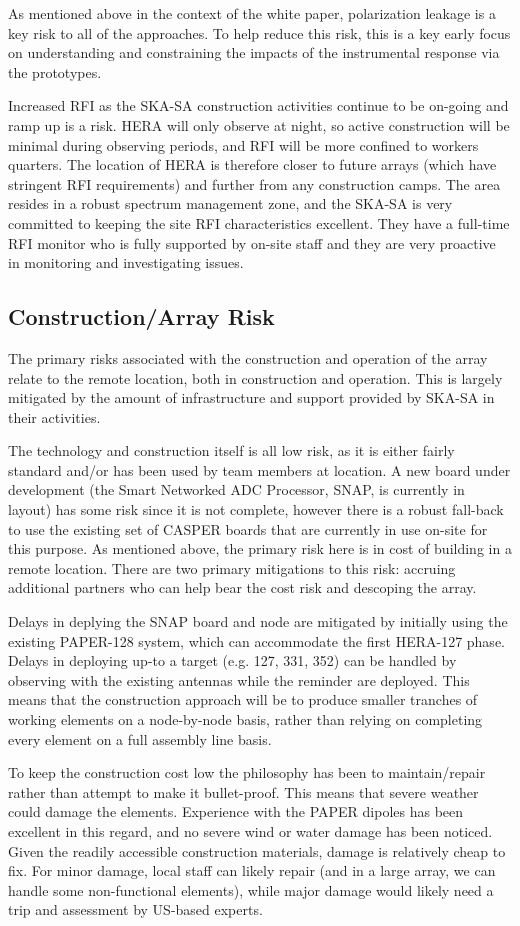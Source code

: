 \documentclass[preprint]{aastex}
\begin{document}
As mentioned above in the context of the white paper, polarization leakage is a key
risk to all of the approaches.  To help reduce this risk, this is a key early focus on understanding and
constraining the impacts of the instrumental response via the prototypes.

Increased RFI as the SKA-SA construction activities continue to be on-going and 
ramp up is a risk.  HERA will only observe at night, so active construction will be
minimal during observing periods, and RFI will be more confined to workers quarters.
The location of HERA is therefore closer to future arrays (which have stringent
RFI requirements) and further from any construction camps.  The area resides in
a robust spectrum management zone, and the SKA-SA is very committed to
keeping the site RFI characteristics excellent.  They have a full-time RFI monitor
who is fully supported by on-site staff and they are very proactive in monitoring
and investigating issues.

\subsection{Construction/Array Risk}
The primary risks associated with the construction and operation of the array relate
to the remote location, both in construction and operation. This is largely mitigated
by the amount of infrastructure and support provided by SKA-SA in their activities.

The technology and construction itself is all low risk, as it is either fairly standard and/or
has been used by team members at location.  A new board under development (the Smart Networked
ADC Processor, SNAP, is currently in layout) has some risk since it is not complete, however there
is a robust fall-back to use the existing set of CASPER boards that are currently in use on-site for this
purpose.  As mentioned above, the primary risk here is in cost of building in a remote location.
There are two primary mitigations to this risk:  accruing additional partners who can help bear
the cost risk and descoping the array.

Delays in deplying the SNAP board and node are
mitigated by initially using the existing PAPER-128 system, which can accommodate the first 
HERA-127 phase.  Delays in deploying up-to a target (e.g. 127, 331, 352) can be handled by
observing with the existing antennas while the reminder are deployed.  This means that the
construction approach will be to produce smaller tranches of working elements on a node-by-node
basis, rather than relying on completing every element on a full assembly line basis.

To keep the construction cost low the philosophy has been to maintain/repair rather
than attempt to make it bullet-proof. This means that severe weather could damage the
elements. Experience with the PAPER dipoles has been excellent in this regard, and no
severe wind or water damage has been noticed. Given the readily accessible
construction materials, damage is relatively cheap to fix. For minor damage, local
staff can likely repair (and in a large array, we can handle some non-functional
elements), while major damage would likely need a trip and assessment by US-based
experts.
\end{document}
